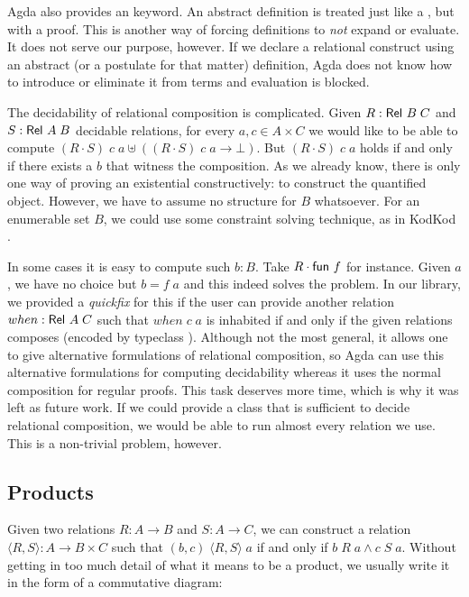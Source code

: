 
Agda also provides an  keyword. An abstract definition is treated just
like a , but with a proof. This is another way of forcing definitions to \emph{not}
expand or evaluate. It does not serve our purpose, however. If we declare a relational construct
using an abstract (or a postulate for that matter) definition, Agda does not know
how to introduce or eliminate it from terms and evaluation is blocked.

The decidability of relational composition is complicated. Given $R : \F{Rel }B\; C$ 
and $S : \F{Rel }A\; B$ decidable relations, for every $a , c \in A \times C$ we would like to be able to compute 
$(R \cdot S)\; c\; a \uplus ((R \cdot S)\; c\; a \rightarrow \bot)$. But $(R \cdot S)\; c\; a$ 
holds if and only if there exists a $b$ that witness the composition. As we already know, there is
only one way of proving an existential constructively: to construct the quantified object. 
However, we have to assume no structure for $B$ whatsoever. For an enumerable set $B$,
we could use some constraint solving technique, as in KodKod \cite{Torlak09}.

In some cases it is easy to compute such $b : B$. Take $R\cdot \F{fun }f $ for instance.
Given $a$, we have no choice but $b = f\; a$ and this indeed solves the problem. 
In our library, we provided a \emph{quickfix} for this if the user can 
provide another relation $when : \F{Rel }A\; C$ such that $when\;c\;a$ is
inhabited if and only if the given relations composes (encoded by typeclass ). 
Although not the most general,
it allows one to give alternative formulations of relational composition, so Agda
can use this alternative formulations for computing decidability whereas it uses
the normal composition for regular proofs. This task deserves more time, which is why it was
left as future work. If we could provide a class that is sufficient to decide relational composition, we would
be able to run almost every relation we use. This is a non-trivial problem, however.


\subsection{Products}
\label{sec:relations:products}

Given two relations $R : A \rightarrow B$ and $S : A \rightarrow C$, we can construct a relation
$\langle R , S \rangle : A \rightarrow B \times C$ such that $(b,c)\;\langle R , S \rangle\;a$ if and only if $b\;R\;a \wedge c\;S\;a$.
Without getting in too much detail of what it means to be a product, we usually write
it in the form of a commutative diagram:

